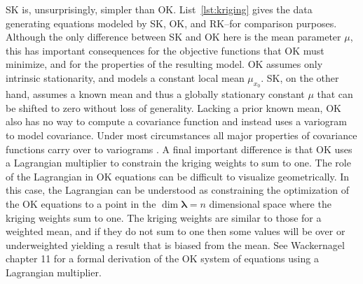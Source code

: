 \documentclass[draft]{article}
\begin{document}
SK is, unsurprisingly, simpler than OK.  List~\ref{lst:kriging} gives the data generating equations modeled by SK, OK, and RK--for comparison purposes.  Although the only difference between SK and OK here is the mean parameter $\mu$, this has important consequences for the objective functions that OK must minimize, and for the properties of the resulting model.  OK assumes only intrinsic stationarity, and models a constant local mean $\mu_{x_0}$.  SK, on the other hand, assumes a known mean and thus a globally stationary constant $\mu$ that can be shifted to zero without loss of generality.  Lacking a prior known mean, OK also has no way to compute a covariance function and instead uses a variogram to model covariance.  Under most circumstances all major properties of covariance functions carry over to variograms \cite{gneiting00, wackernagel03a}.  %
A final important difference is that OK uses a Lagrangian multiplier to constrain the kriging weights to sum to one.  The role of the Lagrangian in OK equations can be difficult to visualize geometrically.  In this case, the Lagrangian can be understood as constraining the optimization of the OK equations to a point in the $\dim{\bm{\lambda}} = n$ dimensional space where the kriging weights sum to one.  The kriging weights are similar to those for a weighted mean, and if they do not sum to one then some values will be over or underweighted yielding a result that is biased from the mean.  See Wackernagel \cite{wackernagel03a} chapter 11 for a formal derivation of the OK system of equations using a Lagrangian multiplier.%
\end{document}
